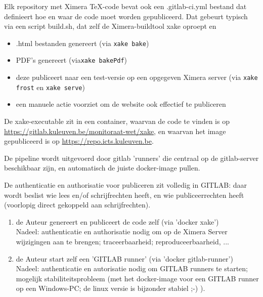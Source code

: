 \documentclass{ximera}
\begin{document}
Elk repository met Ximera TeX-code bevat ook een .gitlab-ci.yml bestand dat definieert hoe en waar de code moet worden gepubliceerd.
Dat gebeurt typisch via een script build.sh, dat zelf de Ximera-buildtool xake oproept en

\begin{itemize}
    \setlength\itemsep{0em}
    \item .html bestanden genereert  (via \texttt{xake bake})
    \item PDF's genereert (via\texttt{xake bakePdf})
    \item deze publiceert naar een test-versie op een opgegeven Ximera server (via \texttt{xake frost} en \texttt{xake serve})
    \item een manuele actie voorziet om de website ook effectief te publiceren
\end{itemize}

De xake-executable zit in een container, waarvan de code te vinden is op  \url{https://gitlab.kuleuven.be/monitoraat-wet/xake}, en waarvan het image gepubliceerd is op \url{ https://repo.icts.kuleuven.be}.

De pipeline wordt uitgevoerd door gitlab 'runners' die centraal op de gitlab-server beschikbaar zijn, en automatisch de juiste docker-image pullen.

De authenticatie en authorisatie voor publiceren zit volledig in GITLAB: daar wordt beslist wie lees en/of schrijfrechten heeft, en wie publiceerrechten heeft (voorlopig direct gekoppeld aan schrijfrechten).

\begin{xmuitweiding}\nl
    
\begin{enumerate}
    \item de Auteur genereert en publiceert de code zelf (via 'docker xake')
    \\ Nadeel: authenticatie en authorisatie nodig om op de Ximera Server wijzigingen aan te brengen; traceerbaarheid;  reproduceerbaarheid, ...
    \item de Auteur start zelf een 'GITLAB runner'  (via 'docker gitlab-runner')
    \\ Nadeel: authenticatie en autorisatie nodig om GITLAB runners te starten; mogelijk stabiliteitsprobleem  (met het docker-image voor een GITLAB runner op een Windows-PC; de linux versie is bijzonder stabiel ;-) ).
    
\end{enumerate}
\end{xmuitweiding}
\end{document}
